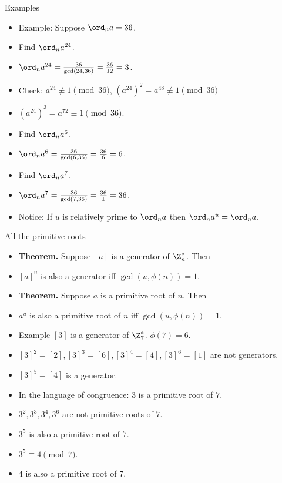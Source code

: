 \documentclass{beamer}
\begin{document}
\begin{frame}{Examples}

\begin{itemize}
  \item Example: Suppose $\ord_n a = 36$.
  \item Find $\ord_n a^{24}$.
  \item $\ord_n a^{24} = \frac{36}{\gcd(24,36)} = \frac{36}{12} = 3$.
  \item Check: $a^{24} \not\equiv 1 \pmod{36}$, $(a^{24})^2=a^{48} \not\equiv 1 \pmod{36}$
  \item $(a^{24})^3=a^{72} \equiv 1 \pmod{36}$.
  \item Find $\ord_n a^{6}$.
  \item $\ord_n a^{6} = \frac{36}{\gcd(6,36)} = \frac{36}{6} = 6$.
  \item Find $\ord_n a^{7}$.
  \item $\ord_n a^{7} = \frac{36}{\gcd(7,36)} = \frac{36}{1} = 36$.
  \item Notice: If $u$ is relatively prime to $\ord_n a$ then $\ord_n a^u = \ord_n a$.
\end{itemize}

\end{frame}

\begin{frame}{All the primitive roots}

\begin{itemize}
  \item \textbf{Theorem.} Suppose $[a]$ is a generator of $\Z_n^*$. Then
  \item $[a]^u$ is also a generator iff $\gcd(u,\phi(n)) = 1$.
  \item \textbf{Theorem.} Suppose $a$ is a primitive root of $n$. Then
  \item $a^u$ is also a primitive root of $n$ iff $\gcd(u,\phi(n))=1$.
  \item Example $[3]$ is a generator of $\Z_7^*$. $\phi(7) = 6$.
  \item $[3]^2 = [2], [3]^3 = [6], [3]^4=[4], [3]^6=[1]$ are not generators.
  \item $[3]^5=[4]$ is a generator.
  \item In the language of congruence: $3$ is a primitive root of $7$.
  \item $3^2, 3^3, 3^4, 3^6$ are not primitive roots of $7$.
  \item $3^5$ is also a primitive root of $7$.
  \item $3^5 \equiv 4 \pmod 7$.
  \item $4$ is also a primitive root of $7$.
\end{itemize}

\end{frame}
\end{document}
